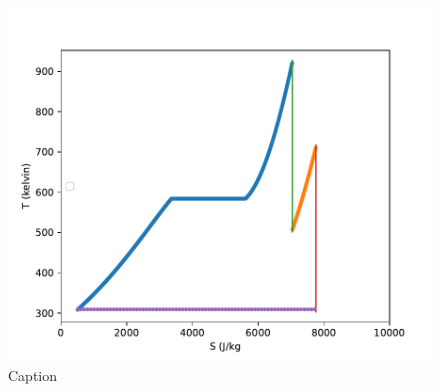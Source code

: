 \documentclass{article}
\begin{document}
\begin{figure}
    \centering
    \includegraphics{RankineInitial.pdf}
    \caption{Caption}
    
    \label{fig:my_label}
\end{figure}

\FloatBarrier
\end{document}
